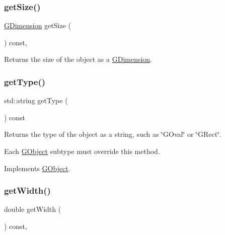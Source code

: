 \subsubsection{\texorpdfstring{get\+Size()}{getSize()}}
{\footnotesize\ttfamily \mbox{\hyperlink{classGDimension}{G\+Dimension}} get\+Size (\begin{DoxyParamCaption}{ }\end{DoxyParamCaption}) const\hspace{0.3cm}{\ttfamily [virtual]}, {\ttfamily [inherited]}}



Returns the size of the object as a {\ttfamily \mbox{\hyperlink{classGDimension}{G\+Dimension}}}. 

\mbox{\label{classGCompound_a9896d58fcfebbf1025aeeb5b8b9ede80}} 
\subsubsection{\texorpdfstring{get\+Type()}{getType()}}
{\footnotesize\ttfamily std\+::string get\+Type (\begin{DoxyParamCaption}{ }\end{DoxyParamCaption}) const\hspace{0.3cm}{\ttfamily [virtual]}}



Returns the type of the object as a string, such as {\ttfamily \char`\"{}\+G\+Oval\char`\"{}} or {\ttfamily \char`\"{}\+G\+Rect\char`\"{}}. 

Each \mbox{\hyperlink{classGObject}{G\+Object}} subtype must override this method. 

Implements \mbox{\hyperlink{classGObject_a799e073a127b428cc841086d42ea4fed}{G\+Object}}.

\mbox{\label{classGObject_a0ed2965abd4f5701d2cadf71239faf19}} 
\subsubsection{\texorpdfstring{get\+Width()}{getWidth()}}
{\footnotesize\ttfamily double get\+Width (\begin{DoxyParamCaption}{ }\end{DoxyParamCaption}) const\hspace{0.3cm}{\ttfamily [virtual]}, {\ttfamily [inherited]}}



